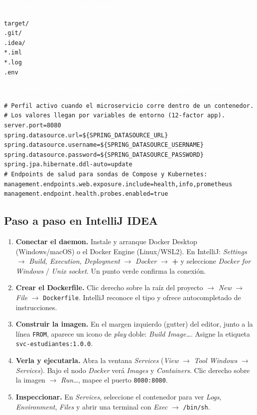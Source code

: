 \documentclass[11pt,a4paper]{article}
\newcommand{\archivo}[1]{\par\vspace{5pt}\noindent\colorbox{uteqBlue}{\textcolor{white}{\small\,\faFileIco\ \texttt{#1}\,}}\par\nopagebreak\vspace{1pt}}
\newcommand{\faFileIco}{\raisebox{-0.1ex}{\scriptsize$\square$}}
\begin{document}
\archivo{svc-estudiantes/.dockerignore}
\begin{lstlisting}[numbers=none]
target/
.git/
.idea/
*.iml
*.log
.env
\end{lstlisting}

\archivo{svc-estudiantes/src/main/resources/application-docker.properties}
\begin{lstlisting}[language=properties]
# Perfil activo cuando el microservicio corre dentro de un contenedor.
# Los valores llegan por variables de entorno (12-factor app).
server.port=8080
spring.datasource.url=${SPRING_DATASOURCE_URL}
spring.datasource.username=${SPRING_DATASOURCE_USERNAME}
spring.datasource.password=${SPRING_DATASOURCE_PASSWORD}
spring.jpa.hibernate.ddl-auto=update
# Endpoints de salud para sondas de Compose y Kubernetes:
management.endpoints.web.exposure.include=health,info,prometheus
management.endpoint.health.probes.enabled=true
\end{lstlisting}

\subsection{Paso a paso en IntelliJ IDEA}

\begin{enumerate}
\item \textbf{Conectar el daemon.} Instale y arranque Docker Desktop (Windows/macOS) o el Docker Engine (Linux/WSL2). En IntelliJ: \emph{Settings} $\rightarrow$ \emph{Build, Execution, Deployment} $\rightarrow$ \emph{Docker} $\rightarrow$ \textbf{+} y seleccione \emph{Docker for Windows} / \emph{Unix socket}. Un punto verde confirma la conexi\'on.
\item \textbf{Crear el Dockerfile.} Clic derecho sobre la ra\'iz del proyecto $\rightarrow$ \emph{New} $\rightarrow$ \emph{File} $\rightarrow$ \texttt{Dockerfile}. IntelliJ reconoce el tipo y ofrece autocompletado de instrucciones.
\item \textbf{Construir la imagen.} En el margen izquierdo (gutter) del editor, junto a la l\'inea \texttt{FROM}, aparece un icono de \emph{play} doble: \emph{Build Image\ldots}. Asigne la etiqueta \texttt{svc-estudiantes:1.0.0}.
\item \textbf{Verla y ejecutarla.} Abra la ventana \emph{Services} (\emph{View} $\rightarrow$ \emph{Tool Windows} $\rightarrow$ \emph{Services}). Bajo el nodo \emph{Docker} ver\'a \emph{Images} y \emph{Containers}. Clic derecho sobre la imagen $\rightarrow$ \emph{Run\ldots}, mapee el puerto \texttt{8080:8080}.
\item \textbf{Inspeccionar.} En \emph{Services}, seleccione el contenedor para ver \emph{Logs}, \emph{Environment}, \emph{Files} y abrir una terminal con \emph{Exec} $\rightarrow$ \texttt{/bin/sh}.
\end{enumerate}
\end{document}
